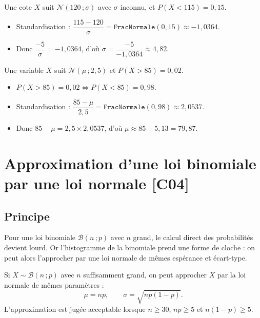 \documentclass[a4paper,11pt]{article}
\begin{document}
\begin{exemple}
Une cote $X$ suit $\mathcal{N}(120\,;\sigma)$ avec $\sigma$ inconnu, et $P(X < 115) = 0{,}15$.
\begin{itemize}
  \item Standardisation : $\dfrac{115 - 120}{\sigma} = \texttt{FracNormale}(0{,}15) \approx -1{,}0364$.
  \item Donc $\dfrac{-5}{\sigma} = -1{,}0364$, d'où $\sigma = \dfrac{-5}{-1{,}0364} \approx 4{,}82$.
\end{itemize}
\end{exemple}

\begin{exemple}
Une variable $X$ suit $\mathcal{N}(\mu\,;2{,}5)$ et $P(X > 85) = 0{,}02$.
\begin{itemize}
  \item $P(X > 85) = 0{,}02 \iff P(X < 85) = 0{,}98$.
  \item Standardisation : $\dfrac{85 - \mu}{2{,}5} = \texttt{FracNormale}(0{,}98) \approx 2{,}0537$.
  \item Donc $85 - \mu = 2{,}5 \times 2{,}0537$, d'où $\mu \approx 85 - 5{,}13 = 79{,}87$.
\end{itemize}
\end{exemple}

\newpage
\section{Approximation d'une loi binomiale par une loi normale \hfill {\normalsize\color{uimmred}[C04]}}

\subsection{Principe}

Pour une loi binomiale $\mathcal{B}(n\,;p)$ avec $n$ grand, le calcul direct des probabilités devient lourd. Or l'histogramme de la binomiale prend une forme de cloche : on peut alors l'approcher par une loi normale de mêmes espérance et écart-type.

\begin{theoreme}
Si $X \sim \mathcal{B}(n\,;p)$ avec $n$ suffisamment grand, on peut approcher $X$ par la loi normale de mêmes paramètres :
\[
\mu = np, \qquad \sigma = \sqrt{np(1-p)}.
\]
L'approximation est jugée acceptable lorsque $n \geq 30$, $np \geq 5$ et $n(1-p) \geq 5$.
\end{theoreme}
\end{document}
